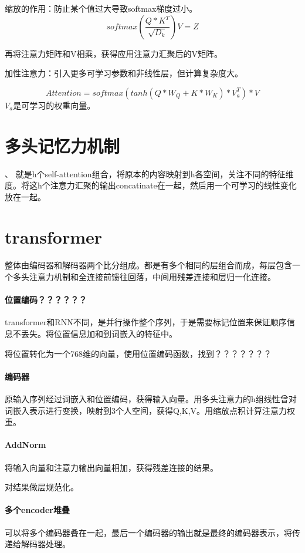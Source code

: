 \documentclass[UTF8]{ctexart}
\begin{document}
缩放的作用：防止某个值过大导致softmax梯度过小。
$$softmax(\frac{Q* K^T}{\sqrt{D_k}})V=Z$$

再将注意力矩阵和V相乘，获得应用注意力汇聚后的V矩阵。

加性注意力：引入更多可学习参数和非线性层，但计算复杂度大。

$$Attention = softmax(tanh(Q*W_Q+K*W_K)*V_a^T)*V$$
$V_a$是可学习的权重向量。

\section{多头记忆力机制}、
就是h个self-attention组合，将原本的内容映射到h各空间，关注不同的特征维度。将这h个注意力汇聚的输出concatinate在一起，然后用一个可学习的线性变化放在一起。

\section{transformer}
整体由编码器和解码器两个比分组成。都是有多个相同的层组合而成，每层包含一个多头注意力机制和全连接前馈往回落，中间用残差连接和层归一化连接。

\paragraph{位置编码？？？？？？}
transformer和RNN不同，是并行操作整个序列，于是需要标记位置来保证顺序信息不丢失。将位置信息加和到词嵌入的特征中。

将位置转化为一个768维的向量，使用位置编码函数，找到？？？？？？？

\paragraph{编码器}
原输入序列经过词嵌入和位置编码，获得输入向量。用多头注意力的h组线性曾对词嵌入表示进行变换，映射到3个人空间，获得Q,K,V。用缩放点积计算注意力权重。

\paragraph{AddNorm}
将输入向量和注意力输出向量相加，获得残差连接的结果。

对结果做层规范化。

\paragraph{多个encoder堆叠}
可以将多个编码器叠在一起，最后一个编码器的输出就是最终的编码器表示，将传递给解码器处理。
\end{document}

